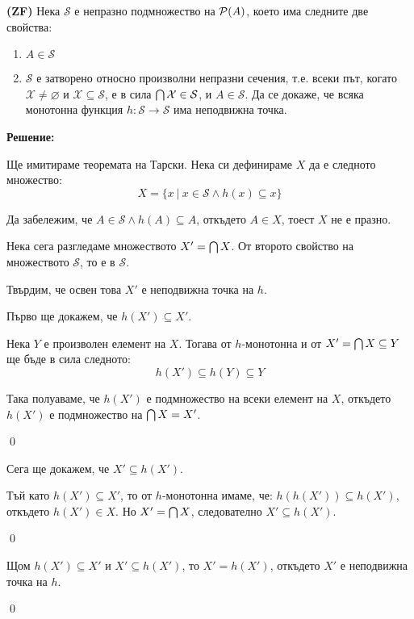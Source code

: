 \begin{problem}
\textbf{(ZF)}
Нека $\mathcal{S}$  е непразно подмножество на $\mathcal{P}(A)$, което има следните две свойства:
\begin{enumerate}
\item
$A \in \mathcal{S}$
\item
$\mathcal{S}$ е затворено относно произволни непразни сечения, т.е. всеки път,
когато $\mathcal{X} \neq \varnothing$ и $\mathcal{X} \subseteq \mathcal{S}$,
е в сила $\bigcap\mathcal{X} \in \mathcal{S}$, и $A \in \mathcal{S}$.
Да се докаже, че всяка монотонна функция $h: \mathcal{S} \to \mathcal{S}$ има неподвижна точка.
\end{enumerate}
\end{problem}

\textbf{Решение:}

\smallbreak
\quad
Ще имитираме теоремата на Тарски. Нека си дефинираме $X$ да е следното множество:
\[
X = \{ x \ |\ x \in \mathcal{S} \land h(x) \subseteq x\}
\]

\quad
Да забележим, че $A \in \mathcal{S} \land h(A) \subseteq A$, откъдето $A \in X$, тоест $X$ не е празно.

\quad
Нека сега разгледаме множеството $X' = \bigcap X$.
От второто свойство на множеството $\mathcal{S}$, то е в $\mathcal{S}$.

\quad
Твърдим, че освен това $X'$ е неподвижна точка на $h$.

\begin{tcolorbox}[mybox={Доказателство:}]
\quad
Първо ще докажем, че $h(X') \subseteq X'$.

\begin{tcolorbox}[mybox={Доказателство:}, colback=green!20, colframe=green!60]
\quad
Нека $Y$ е произволен елемент на $X$. Тогава от $h$-монотонна и от $X' = \bigcap X \subseteq Y$ ще бъде в сила следното:
\[
h(X') \subseteq h(Y) \subseteq Y
\]

\quad
Така полуаваме, че $h(X')$ е подмножество на всеки елемент на $X$,
откъдето $h(X')$ е подмножество на $\bigcap X = X'$.

\qed
\end{tcolorbox}

\quad
Сега ще докажем, че $X' \subseteq h(X')$.

\begin{tcolorbox}[mybox={Доказателство:}, colback=green!20, colframe=green!60]
\quad
Тъй като $h(X') \subseteq X'$, то от $h$-монотонна имаме, че:
$h(h(X')) \subseteq h(X')$, откъдето $h(X') \in X$. Но $X' = \bigcap X$,
следователно $X' \subseteq h(X')$.

\qed
\end{tcolorbox}

\quad
Щом $h(X') \subseteq X'$ и $X' \subseteq h(X')$, то $X' = h(X')$, откъдето $X'$ е неподвижна точка на $h$.

\qed
\end{tcolorbox}

